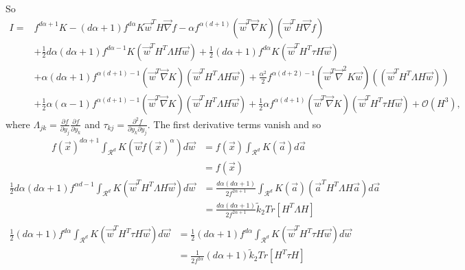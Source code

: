 So
\begin{equation}
	\begin{split}
		I=&f^{d\alpha+1}K-(d\alpha+1)f^{d\alpha}K \vec{w}^T H\vec{\nabla}f-\alpha f^{\alpha(d+1)}(\vec{w}^T\vec{\nabla}K)(\vec{w}^TH\vec{\nabla}f)\\
		&+\frac{1}{2}d\alpha(d\alpha+1)f^{d\alpha -1}K(\vec{w}^TH^T\Lambda H\vec{w})+\frac{1}{2}(d\alpha+1)f^{d\alpha}K(\vec{w}^TH^T\tau H\vec{w})\\
		&+\alpha(d\alpha+1)f^{\alpha(d+1)-1}(\vec{w}^T\vec{\nabla}K)(\vec{w}^TH^T\Lambda H\vec{w})+\frac{\alpha^2}{2}f^{\alpha(d+2)-1}(\vec{w}^T\vec{\nabla}^2K\vec{w})((\vec{w}^TH^T\Lambda H\vec{w}))\\
		&+\frac{1}{2}\alpha(\alpha-1)f^{\alpha(d+1)-1}(\vec{w}^T\vec{\nabla}K)(\vec{w}^TH^T\Lambda H\vec{w})+\frac{1}{2}\alpha f^{\alpha(d+1)}(\vec{w}^T\vec{\nabla}K)(\vec{w}^TH^T\tau H\vec{w})+\mathcal{O}(H^3),
	\end{split}
\end{equation}
where $\Lambda_{jk}=\frac{\partial f}{\partial y_j}\frac{\partial f}{\partial y_k}$ and $\tau_{kj}=\frac{\partial^2 f}{\partial y_k\partial y_j}$. The first derivative terms vanish and so
\begin{equation}
	\begin{split}
		f(\vec{x})^{d\alpha+1}\int_{\mathcal{R}^d}K(\vec{w}f(\vec{x})^{\alpha})d\vec{w}&=f(\vec{x})\int_{\mathcal{R}^d}K(\vec{a})d\vec{a}\\
		&=f(\vec{x})
	\end{split}
\end{equation}
\begin{equation}
	\begin{split}
		\frac{1}{2}d\alpha(d\alpha+1)f^{\alpha d-1}\int_{\mathcal{R}^d}K(\vec{w}^TH^T\Lambda H\vec{w})d\vec{w}&=\frac{d\alpha(d\alpha+1)}{2f^{2\alpha+1}}\int_{\mathcal{R}^d}K(\vec{a})(\vec{a}^TH^T\Lambda H\vec{a})d\vec{a}\\
		&=\frac{d\alpha(d\alpha+1)}{2f^{2\alpha+1}}\tilde{k}_2Tr[H^T\Lambda H]\\
	\end{split}
\end{equation}
\begin{equation}
	\begin{split}
		\frac{1}{2}(d\alpha+1)f^{d\alpha}\int_{\mathcal{R}^d}K(\vec{w}^TH^T\tau H\vec{w})d\vec{w}&=\frac{1}{2}(d\alpha+1)f^{d\alpha}\int_{\mathcal{R}^d}K(\vec{w}^TH^T\tau H\vec{w})d\vec{w}\\
		&=\frac{1}{2f^{2\alpha}}(d\alpha+1)\tilde{k}_2Tr[H^T\tau H]\\
	\end{split}
\end{equation}

